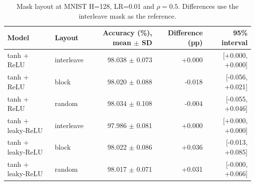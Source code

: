 \begin{table}[htbp]
\centering
\caption{Mask layout at MNIST H=128, LR=0.01 and $\rho=0.5$. Differences use the interleave mask as the reference.}
\label{tab:layouts}
\footnotesize
\begin{tabular}{@{}llrrr@{}}
\toprule
Model & Layout & Accuracy (\%), mean $\pm$ SD & Difference (pp) & 95\% interval \\
\midrule
tanh + ReLU & interleave & 98.038 $\pm$ 0.073 & +0.000 & [+0.000, +0.000] \\
tanh + ReLU & block & 98.020 $\pm$ 0.088 & -0.018 & [-0.056, +0.021] \\
tanh + ReLU & random & 98.034 $\pm$ 0.108 & -0.004 & [-0.055, +0.046] \\
tanh + leaky-ReLU & interleave & 97.986 $\pm$ 0.081 & +0.000 & [+0.000, +0.000] \\
tanh + leaky-ReLU & block & 98.022 $\pm$ 0.086 & +0.036 & [-0.013, +0.085] \\
tanh + leaky-ReLU & random & 98.017 $\pm$ 0.071 & +0.031 & [-0.000, +0.066] \\
\bottomrule
\end{tabular}
\end{table}
